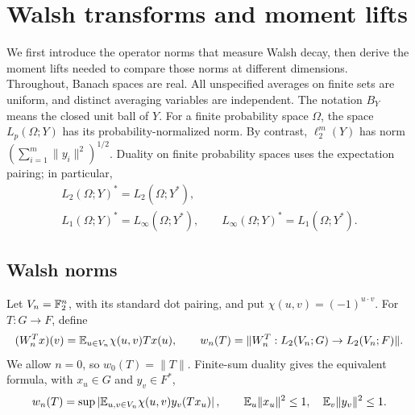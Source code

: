 \section{Walsh transforms and moment lifts}\label{sec:preliminaries}

We first introduce the operator norms that measure Walsh decay, then derive
the moment lifts needed to compare those norms at different dimensions.
Throughout, Banach spaces are real. All unspecified averages on finite
sets are uniform, and distinct averaging variables are independent.
The notation \(B_Y\) means the closed unit ball of \(Y\).
For a finite probability space \(\Omega\), the space \(L_p(\Omega;Y)\)
has its probability-normalized norm. By contrast,
\(\ell_2^m(Y)\) has norm \((\sum_{i=1}^m\|y_i\|^2)^{1/2}\).
Duality on finite probability spaces uses the expectation pairing;
in particular,
\[
\begin{gathered}
L_2(\Omega;Y)^*=L_2(\Omega;Y^*),\\
L_1(\Omega;Y)^*=L_\infty(\Omega;Y^*),\qquad
L_\infty(\Omega;Y)^*=L_1(\Omega;Y^*).
\end{gathered}
\]

\subsection{Walsh norms}

Let \(V_n=\mathbb F_2^n\), with its standard dot pairing, and put
\(\chi(u,v)=(-1)^{u\cdot v}\). For \(T:G\to F\), define
\[
(W_n^Tx)(v)=\mathbb E_{u\in V_n}\chi(u,v)Tx(u),\qquad
w_n(T)=\|W_n^T:L_2(V_n;G)\to L_2(V_n;F)\|.
\]
We allow \(n=0\), so \(w_0(T)=\|T\|\).
Finite-sum duality gives the equivalent formula, with
\(x_u\in G\) and \(y_v\in F^*\),
\begin{equation}\label{eq:walsh-bilinear}
w_n(T)=\sup\left|
\mathbb E_{u,v\in V_n}\chi(u,v)y_v(Tx_u)\right|,
\qquad
\mathbb E_u\|x_u\|^2\le1,\quad \mathbb E_v\|y_v\|^2\le1.
\end{equation}

